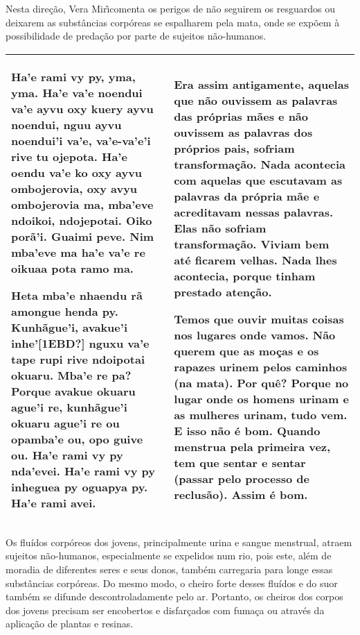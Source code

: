 \documentclass{article}
\begin{document}
Nesta dire\c{c}\~ao, Vera Mir\~\i comenta os perigos de n\~ao seguirem
os resguardos ou deixarem as subst\^ancias corp\'oreas se espalharem
pela mata, onde se exp\~oem \`a possibilidade de preda\c{c}\~ao por
parte de sujeitos n\~ao-humanos. 

\begin{flushleft}
\tablehead{}
\begin{supertabular}{m{2.87756in}|m{2.8781598in}}
Ha{\textquoteright}e rami vy py, yma, yma. Ha{\textquoteright}e
va{\textquoteright}e noendui va{\textquoteright}e ayvu oxy kuery ayvu
noendui, nguu ayvu noendui{\textquoteright}i va{\textquoteright}e,
va{\textquoteright}e-va{\textquoteright}e{\textquoteright}i rive tu
ojepota. Ha{\textquoteright}e oendu va{\textquoteright}e ko oxy ayvu
ombojerovia, oxy avyu ombojerovia ma, mba{\textquoteright}eve ndoikoi,
ndojepotai. Oiko por\~a{\textquoteright}i. Guaimi peve. Nim
mba{\textquoteright}eve ma ha{\textquoteright}e va{\textquoteright}e re
oikuaa pota ramo ma. 

Heta mba{\textquoteright}e nhaendu r\~a amongue henda py.
Kunh\~ague{\textquoteright}i, avakue{\textquoteright}i
inhe{\textquoteright}[1EBD?] nguxu va{\textquoteright}e tape rupi rive
ndoipotai okuaru. Mba{\textquoteright}e re pa? Porque avakue okuaru
ague{\textquoteright}i re, kunh\~ague{\textquoteright}i okuaru
ague{\textquoteright}i re ou opamba{\textquoteright}e ou, opo guive ou.
 Ha{\textquoteright}e rami vy py nda{\textquoteright}evei.
Ha{\textquoteright}e rami vy py inheguea py oguapya py.
Ha{\textquoteright}e rami avei.  &
Era assim antigamente, aquelas que n\~ao ouvissem as palavras das
pr\'oprias m\~aes e n\~ao ouvissem as palavras dos pr\'oprios pais,
sofriam transforma\c{c}\~ao. Nada acontecia com aquelas que escutavam
as palavras da pr\'opria m\~ae e acreditavam nessas palavras. Elas
n\~ao sofriam transforma\c{c}\~ao. Viviam bem at\'e ficarem velhas.
Nada lhes acontecia, porque tinham prestado aten\c{c}\~ao. 

Temos que ouvir muitas coisas nos lugares onde vamos. N\~ao querem que
as mo\c{c}as e os rapazes urinem pelos caminhos (na mata). Por qu\^e?
Porque no lugar onde os homens urinam e as mulheres urinam, tudo
vem\footnotemark{}. E isso n\~ao \'e bom. Quando menstrua pela primeira
vez, tem que sentar e sentar (passar pelo processo de reclus\~ao). 
Assim \'e bom. \\\hline
\end{supertabular}
\end{flushleft}
Os flu\'idos corp\'oreos dos jovens, principalmente urina e sangue
menstrual, atraem sujeitos n\~ao-humanos, especialmente se expelidos
num rio, pois este, al\'em de moradia de diferentes seres e seus donos,
tamb\'em carregaria para longe essas subst\^ancias corp\'oreas. Do
mesmo modo, o cheiro forte desses flu\'idos e do suor tamb\'em se
difunde descontroladamente pelo ar. Portanto, os cheiros dos corpos dos
jovens precisam ser encobertos e disfar\c{c}ados com fuma\c{c}a ou
atrav\'es da aplica\c{c}\~ao de plantas e resinas. 
\end{document}

